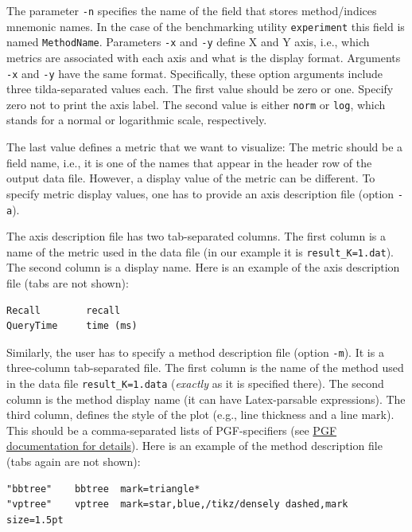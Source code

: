 \documentclass[runningheads,a4paper]{llncs}
\newcommand{\ttt}[1]{\texttt{#1}}
\begin{document}
{The parameter \ttt{-n} specifies the name of the field that stores method/indices mnemonic names.
In the case of the benchmarking utility \ttt{experiment} this field is named \ttt{MethodName}.
Parameters \ttt{-x} and \ttt{-y} define  X and Y axis, i.e.,
which metrics are associated with each axis and what is the display format.
Arguments  \ttt{-x} and \ttt{-y} have the same format.
Specifically, these option arguments include three tilda-separated values each. 
The first value should be zero or one.
Specify zero not to print the axis label.
The second value is either \ttt{norm} or \ttt{log}, 
which stands for a normal or logarithmic scale, respectively.

The last value defines a metric that we want to visualize:
The metric should be a field name, i.e.,
it is one of the names that appear in the header row of the output data file.
However, a display value of the metric can be different.
To specify metric display values, one has to provide an axis description file (option \ttt{-a}). 

The axis description file has two tab-separated columns.
The first column is a name of the metric used in the data file (in our example it is \ttt{result\_K=1.dat}).
The second column is a display name. Here is an example of the axis description file (tabs are not shown):
\begin{verbatim}
Recall        recall 
QueryTime     time (ms)
\end{verbatim}

Similarly, the user has to specify a method description file (option \ttt{-m}).
It is a three-column tab-separated file. The first column is the name of the method
used in the data file \ttt{result\_K=1.data} (\emph{exactly} as it is specified there).
The second column is the method display name (it can have Latex-parsable expressions). 
The third column, defines the style of the plot (e.g., line thickness and a line mark). 
This should be a comma-separated lists of PGF-specifiers 
(see \href{http://ftp.fau.de/ctan/graphics/pgf/base/doc/pgfmanual.pdf}{PGF documentation for details}).
Here is an example of the method description file (tabs again are not shown):
\begin{verbatim}
"bbtree"	bbtree	mark=triangle*
"vptree"	vptree	mark=star,blue,/tikz/densely dashed,mark size=1.5pt
\end{verbatim}

}
\end{document}
